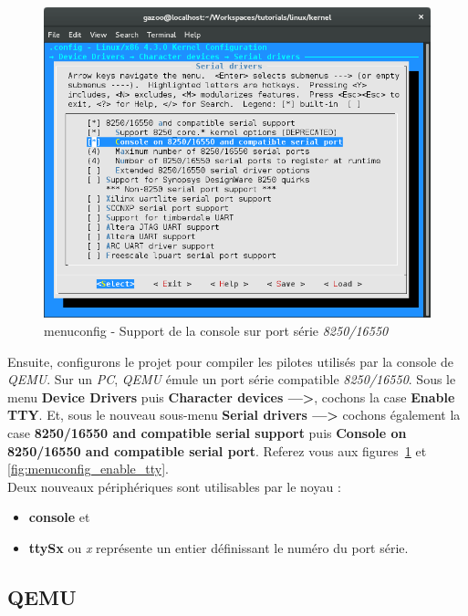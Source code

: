 \documentclass[a4paper]{article}
\begin{document}
\begin{figure}
\label{fig:menuconfig_enable_console}
\includegraphics[scale=0.5]{../res/menuconfig-enable-console-on-8250-16550-serial-port.png}
\caption{menuconfig - Support de la console sur port série \textit{8250/16550}}
\end{figure}

Ensuite, configurons le projet pour compiler les pilotes utilisés par la console de \textit{QEMU}. Sur un \textit{PC}, \textit{QEMU} émule un port série compatible \textit{8250/16550}. Sous le menu \textbf{Device Drivers} puis \textbf{Character devices  --->}, cochons la case \textbf{Enable TTY}. Et, sous le nouveau sous-menu \textbf{Serial drivers  --->} cochons également la case \textbf{8250/16550 and compatible serial support} puis \textbf{Console on 8250/16550 and compatible serial port}. Referez vous aux figures~\ref{fig:menuconfig_enable_console} et \ref{fig:menuconfig_enable_tty}.\\

Deux nouveaux périphériques sont utilisables par le noyau :
\begin{itemize}
\item \textbf{console} et
\item \textbf{ttySx} ou \textit{x} représente un entier définissant le numéro du port série.
\end{itemize}

\subsection{QEMU}
\end{document}
